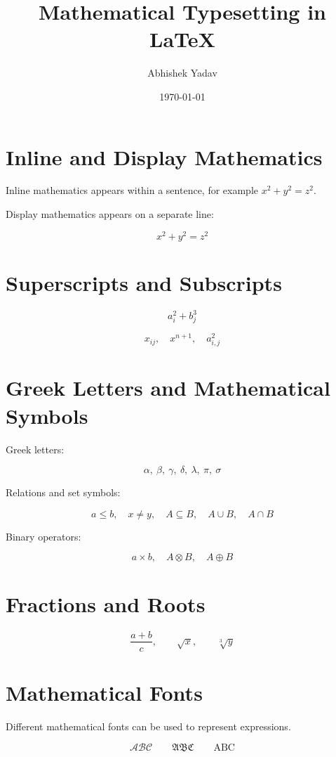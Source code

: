 \documentclass{article}
\title{Mathematical Typesetting in LaTeX}
\author{Abhishek Yadav}
\date{\today}
\begin{document}
\maketitle

\section{Inline and Display Mathematics}

Inline mathematics appears within a sentence, for example
\(x^2 + y^2 = z^2\).

Display mathematics appears on a separate line:

\[
x^2 + y^2 = z^2
\]

\section{Superscripts and Subscripts}

\[
a_i^2 + b_j^3
\]

\[
x_{ij}, \quad x^{n+1}, \quad a_{i,j}^{2}
\]

\section{Greek Letters and Mathematical Symbols}

Greek letters:

\[
\alpha,\ \beta,\ \gamma,\ \delta,\ \lambda,\ \pi,\ \sigma
\]

Relations and set symbols:

\[
a \leq b,\quad x \neq y,\quad
A \subseteq B,\quad A \cup B,\quad A \cap B
\]

Binary operators:

\[
a \times b,\quad A \otimes B,\quad A \oplus B
\]

\section{Fractions and Roots}

\[
\frac{a+b}{c}, \qquad
\sqrt{x}, \qquad
\sqrt[3]{y}
\]

\section{Mathematical Fonts}

Different mathematical fonts can be used to represent expressions.

\[
\mathcal{ABC} \qquad
\mathfrak{ABC} \qquad
\mathrm{ABC}
\]
\end{document}
